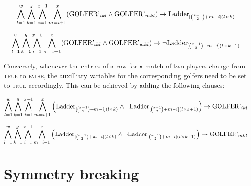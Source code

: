 \documentclass[a4paper]{scrartcl}
\begin{document}
\begin{equation}
\centering
    \bigwedge \limits_{l=1}^{w}
    \bigwedge \limits_{k=1}^{g}
    \bigwedge \limits_{i=1}^{x-1}
    \bigwedge \limits_{m=i+1}^{x}
    (\text{GOLFER'}_{ikl} \wedge \text{GOLFER'}_{mkl}) \to \text{Ladder}_{[{x-1 \choose 2}+m-i](l \times k)}
\end{equation}

\begin{equation}
\centering
    \bigwedge \limits_{l=1}^{w}
    \bigwedge \limits_{k=1}^{g}
    \bigwedge \limits_{i=1}^{x-1}
    \bigwedge \limits_{m=i+1}^{x}
    (\text{GOLFER'}_{ikl} \wedge \text{GOLFER'}_{mkl}) \to \neg \text{Ladder}_{[{x-1 \choose 2}+m-i](l \times k + 1)}
\end{equation}

Conversely, whenever the entries of a row for a match of two players change from \textsc{true} to \textsc{false}, the auxilliary  variables for the corresponding golfers need to be set to \textsc{true} accordingly. This can be achieved by adding the following clauses:

\begin{equation}
\centering
    \bigwedge \limits_{l=1}^{w}
    \bigwedge \limits_{k=1}^{g}
    \bigwedge \limits_{i=1}^{x-1}
    \bigwedge \limits_{m=i+1}^{x}
    \Big(
        \text{Ladder}_{
            [
                {x-1 \choose 2}
                +m-i
            ](l \times k)
        }
        \wedge
        \neg
        \text{Ladder}_{
            [
                {x-1 \choose 2}
                +m-i
            ](l \times k + 1)
        }
    \Big)
    \to
    \text{GOLFER'}_{ikl}
\end{equation}

\begin{equation}
\centering
    \bigwedge \limits_{l=1}^{w}
    \bigwedge \limits_{k=1}^{g}
    \bigwedge \limits_{i=1}^{x-1}
    \bigwedge \limits_{m=i+1}^{x}
    \Big(
        \text{Ladder}_{
            [
                {x-1 \choose 2}
                +m-i
            ](l \times k)
        }
        \wedge
        \neg
        \text{Ladder}_{
            [
                {x-1 \choose 2}
                +m-i
            ](l \times k + 1)
        }
    \Big)
    \to
    \text{GOLFER'}_{mkl}
\end{equation}

\section{Symmetry breaking}
\end{document}
